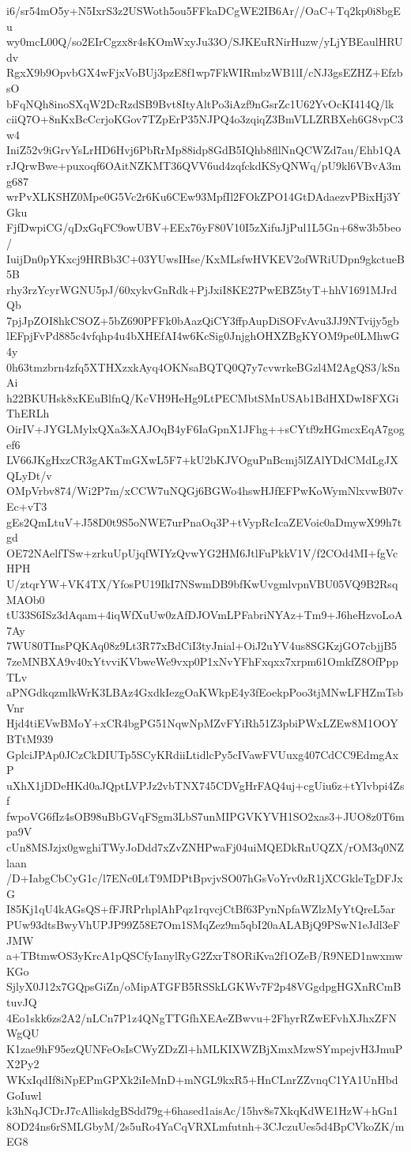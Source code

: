 i6/sr54mO5y+N5IxrS3z2USWoth5ou5FFkaDCgWE2IB6Ar//OaC+Tq2kp0i8bgEu
wy0mcL00Q/so2EIrCgzx8r4sKOmWxyJu33O/SJKEuRNirHuzw/yLjYBEaulHRUdv
RgxX9b9OpvbGX4wFjxVoBUj3pzE8f1wp7FkWIRmbzWB1lI/cNJ3gsEZHZ+EfzbsO
bFqNQh8inoSXqW2DcRzdSB9Bvt8ItyAltPo3iAzf9nGsrZc1U62YvOcKI414Q/lk
ciiQ7O+8nKxBcCcrjoKGov7TZpErP35NJPQ4o3zqiqZ3BmVLLZRBXeh6G8vpC3w4
IniZ52v9iGrvYsLrHD6Hvj6PbRrMp88idp8GdB5IQhb8fllNnQCWZd7au/Ehb1QA
rJQrwBwe+puxoqf6OAitNZKMT36QVV6ud4zqfckdKSyQNWq/pU9kl6VBvA3mg687
wrPvXLKSHZ0Mpe0G5Vc2r6Ku6CEw93MpfIl2FOkZPO14GtDAdaezvPBixHj3YGku
FjfDwpiCG/qDxGqFC9owUBV+EEx76yF80V10I5zXifuJjPul1L5Gn+68w3b5beo/
IuijDn0pYKxcj9HRBb3C+03YUwsIHse/KxMLsfwHVKEV2ofWRiUDpn9gkctueB5B
rhy3rzYcyrWGNU5pJ/60xykvGnRdk+PjJxiI8KE27PwEBZ5tyT+hhV1691MJrdQb
7pjJpZOI8hkCSOZ+5bZ690PFFk0bAazQiCY3ffpAupDiSOFvAvu3JJ9NTvijy5gb
lEFpjFvPd885c4vfqhp4u4bXHEfAI4w6KcSig0JnjghOHXZBgKYOM9pe0LMhwG4y
0h63tmzbrn4zfq5XTHXzxkAyq4OKNsaBQTQ0Q7y7cvwrkeBGzl4M2AgQS3/kSnAi
h22BKUHsk8xKEuBlfnQ/KcVH9HeHg9LtPECMbtSMnUSAb1BdHXDwI8FXGiThERLh
OirIV+JYGLMylxQXa3sXAJOqB4yF6IaGpnX1JFhg++sCYtf9zHGmcxEqA7gogef6
LV66JKgHxzCR3gAKTmGXwL5F7+kU2bKJVOguPnBcmj5lZAlYDdCMdLgJXQLyDt/v
OMpVrbv874/Wi2P7m/xCCW7uNQGj6BGWo4hswHJfEFPwKoWymNlxvwB07vEc+vT3
gEs2QmLtuV+J58D0t9S5oNWE7urPnaOq3P+tVypRcIcaZEVoic0aDmywX99h7tgd
OE72NAelfTSw+zrkuUpUjqfWIYzQvwYG2HM6JtlFuPkkV1V/f2COd4MI+fgVcHPH
U/ztqrYW+VK4TX/YfosPU19IkI7NSwmDB9bfKwUvgmlvpnVBU05VQ9B2RsqMAOb0
tU33S6ISz3dAqam+4iqWfXuUw0zAfDJOVmLPFabriNYAz+Tm9+J6heHzvoLoA7Ay
7WU80TInsPQKAq08z9Lt3R77xBdCiI3tyJnial+OiJ2uYV4us8SGKzjGO7cbjjB5
7zeMNBXA9v40xYtvviKVbweWe9vxp0P1xNvYFhFxqxx7xrpm61OmkfZ8OfPppTLv
aPNGdkqzmlkWrK3LBAz4GxdkIezgOaKWkpE4y3fEoekpPoo3tjMNwLFHZmTsbVnr
Hjd4tiEVwBMoY+xCR4bgPG51NqwNpMZvFYiRh51Z3pbiPWxLZEw8M1OOYBTtM939
GplciJPAp0JCzCkDIUTp5SCyKRdiiLtidlcPy5cIVawFVUuxg407CdCC9EdmgAxP
uXhX1jDDeHKd0aJQptLVPJz2vbTNX745CDVgHrFAQ4uj+cgUiu6z+tYlvbpi4Zsf
fwpoVG6fIz4sOB98uBbGVqFSgm3LbS7unMIPGVKYVH1SO2xas3+JUO8z0T6mpa9V
cUn8MSJzjx0gwghiTWyJoDdd7xZvZNHPwaFj04uiMQEDkRnUQZX/rOM3q0NZlaan
/D+IabgCbCyG1c/l7ENc0LtT9MDPtBpvjvSO07hGsVoYrv0zR1jXCGkleTgDFJxG
I85Kj1qU4kAGsQS+fFJRPrhplAhPqz1rqvcjCtBf63PynNpfaWZlzMyYtQreL5ar
PUw93dtsBwyVhUPJP99Z58E7Om1SMqZez9m5qbI20aALABjQ9PSwN1eJdl3eFJMW
a+TBtmwOS3yKrcA1pQSCfyIanylRyG2ZxrT8ORiKva2f1OZeB/R9NED1nwxmwKGo
SjlyX0J12x7GQpsGiZn/oMipATGFB5RSSkLGKWv7F2p48VGgdpgHGXnRCmBtuvJQ
4Eo1skk6zs2A2/nLCn7P1z4QNgTTGfhXEAeZBwvu+2FhyrRZwEFvhXJhxZFNWgQU
K1zae9hF95ezQUNFeOsIsCWyZDzZl+hMLKIXWZBjXmxMzwSYmpejvH3JmuPX2Py2
WKxIqdIf8iNpEPmGPXk2iIeMnD+mNGL9kxR5+HnCLnrZZvnqC1YA1UnHbdGoIuwl
k3hNqJCDrJ7cAlliskdgBSdd79g+6hased1aisAc/15hv8s7XkqKdWE1HzW+hGn1
8OD24ns6rSMLGbyM/2s5uRo4YaCqVRXLmfutnh+3CJczuUes5d4BpCVkoZK/mEG8
